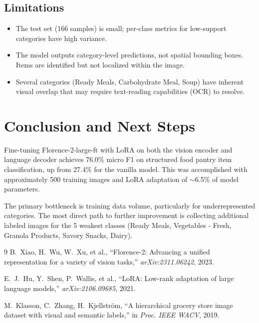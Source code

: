 \documentclass[11pt]{article}
\begin{document}
\subsection{Limitations}

\begin{itemize}[nosep]
\item The test set (166 samples) is small; per-class metrics for low-support categories have high variance.
\item The model outputs category-level predictions, not spatial bounding boxes. Items are identified but not localized within the image.
\item Several categories (Ready Meals, Carbohydrate Meal, Soup) have inherent visual overlap that may require text-reading capabilities (OCR) to resolve.
\end{itemize}

\section{Conclusion and Next Steps}

Fine-tuning Florence-2-large-ft with LoRA on both the vision encoder and language decoder achieves 76.0\% micro F1 on structured food pantry item classification, up from 27.4\% for the vanilla model. This was accomplished with approximately 500 training images and LoRA adaptation of $\sim$6.5\% of model parameters.

The primary bottleneck is training data volume, particularly for underrepresented categories. The most direct path to further improvement is collecting additional labeled images for the 5 weakest classes (Ready Meals, Vegetables - Fresh, Granola Products, Savory Snacks, Dairy).

\begin{thebibliography}{9}
B.~Xiao, H.~Wu, W.~Xu, et al., ``Florence-2: Advancing a unified representation for a variety of vision tasks,'' \textit{arXiv:2311.06242}, 2023.

E.~J.~Hu, Y.~Shen, P.~Wallis, et al., ``LoRA: Low-rank adaptation of large language models,'' \textit{arXiv:2106.09685}, 2021.

M.~Klasson, C.~Zhang, H.~Kjellstr{\"o}m, ``A hierarchical grocery store image dataset with visual and semantic labels,'' in \textit{Proc. IEEE WACV}, 2019.
\end{thebibliography}
\end{document}
